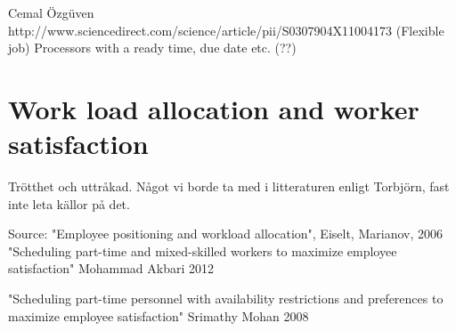 Cemal Özgüven
http://www.sciencedirect.com/science/article/pii/S0307904X11004173 (Flexible job)
Processors with a ready time, due date etc. (??)

\section{Work load allocation and worker satisfaction} \label{WLA}
Trötthet och uttråkad. Något vi borde ta med i litteraturen enligt Torbjörn, fast inte leta källor på det.

Source: "Employee positioning and workload allocation", Eiselt, Marianov, 2006
"Scheduling part-time and mixed-skilled workers to maximize employee satisfaction" Mohammad Akbari 2012

"Scheduling part-time personnel with availability restrictions and preferences to maximize employee satisfaction" Srimathy Mohan 2008




